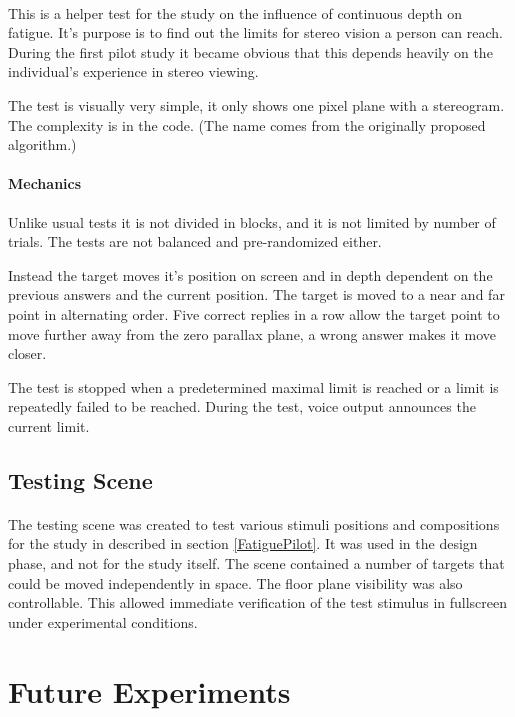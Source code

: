\paragraph{}
This is a helper test for the study on the influence of continuous depth on fatigue.
It's purpose is to find out the limits for stereo vision a person can reach.
During the first pilot study it became obvious that this depends heavily on the individual's experience in stereo viewing.

The test is visually very simple, it only shows one pixel plane with a stereogram.
The complexity is in the code.
(The name comes from the originally proposed algorithm.)

\paragraph{Mechanics}
Unlike usual tests it is not divided in blocks, and it is not limited by number of trials.
The tests are not balanced and pre-randomized either.

Instead the target moves it's position on screen and in depth dependent on the previous answers and the current position.
The target is moved to a near and far point in alternating order.
Five correct replies in a row allow the target point to move further away from the zero parallax plane,
a wrong answer makes it move closer.

The test is stopped when a predetermined maximal limit is reached or a limit is repeatedly failed to be reached.
During the test, voice output announces the current limit.

\subsection{Testing Scene}
\paragraph{}
The testing scene was created to test various stimuli positions and compositions for the study in described in section \ref{FatiguePilot}.
It was used in the design phase, and not for the study itself.
The scene contained a number of targets that could be moved independently in space.
The floor plane visibility was also controllable.
This allowed immediate verification of the test stimulus in fullscreen under experimental conditions.


\section{Future Experiments}

